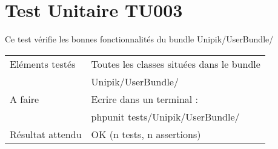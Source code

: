 \section{Test Unitaire TU003}
	
	Ce test vérifie les bonnes fonctionnalités du bundle Unipik/UserBundle/ \\
				
  	\begin{center}
  		\begin{tabular}[h]{|p{}|p{}|}
		\hline
			Eléments testés & Toutes les classes situées dans le bundle \\ 																& Unipik/UserBundle/ \\\hline
    			A faire & Ecrire dans un terminal : \\ 
    					& phpunit tests/Unipik/UserBundle/\\\hline
    			Résultat attendu & OK (n tests, n assertions) \\\hline
     	\end{tabular}
  	\end{center}	 	
